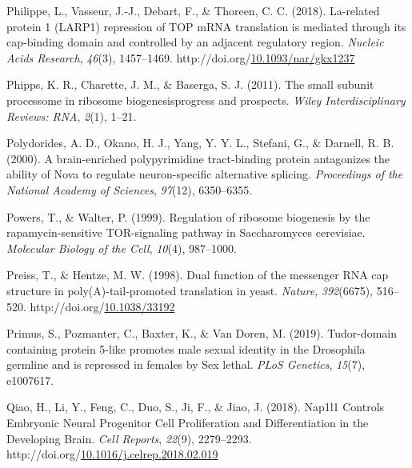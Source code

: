 \documentclass[12pt,oneside]{reedthesis}
\newlength{\cslhangindent}
\newenvironment{CSLReferences}[2] %
 {%
  \setlength{\parindent}{0pt}
  \ifodd #1 \everypar{\setlength{\hangindent}{\cslhangindent}}\ignorespaces\fi
  \ifnum #2 > 0
  \setlength{\parskip}{#2\baselineskip}
  \fi
 }%
 {}
\begin{document}
\begin{CSLReferences}{1}{0}
\leavevmode{}%
Philippe, L., Vasseur, J.-J., Debart, F., \& Thoreen, C. C. (2018). La-related protein 1 ({LARP1}) repression of {TOP mRNA} translation is mediated through its cap-binding domain and controlled by an adjacent regulatory region. \emph{Nucleic Acids Research}, \emph{46}(3), 1457--1469. http://doi.org/\href{https://doi.org/10.1093/nar/gkx1237}{10.1093/nar/gkx1237}

\leavevmode{}%
Phipps, K. R., Charette, J. M., \& Baserga, S. J. (2011). The small subunit processome in ribosome biogenesis\textemdash progress and prospects. \emph{Wiley Interdisciplinary Reviews: RNA}, \emph{2}(1), 1--21.

\leavevmode{}%
Polydorides, A. D., Okano, H. J., Yang, Y. Y. L., Stefani, G., \& Darnell, R. B. (2000). A brain-enriched polypyrimidine tract-binding protein antagonizes the ability of {Nova} to regulate neuron-specific alternative splicing. \emph{Proceedings of the National Academy of Sciences}, \emph{97}(12), 6350--6355.

\leavevmode{}%
Powers, T., \& Walter, P. (1999). Regulation of ribosome biogenesis by the rapamycin-sensitive {TOR-signaling} pathway in {Saccharomyces} cerevisiae. \emph{Molecular Biology of the Cell}, \emph{10}(4), 987--1000.

\leavevmode{}%
Preiss, T., \& Hentze, M. W. (1998). Dual function of the messenger {RNA} cap structure in poly({A})-tail-promoted translation in yeast. \emph{Nature}, \emph{392}(6675), 516--520. http://doi.org/\href{https://doi.org/10.1038/33192}{10.1038/33192}

\leavevmode{}%
Primus, S., Pozmanter, C., Baxter, K., \& Van Doren, M. (2019). Tudor-domain containing protein 5-like promotes male sexual identity in the {Drosophila} germline and is repressed in females by {Sex} lethal. \emph{PLoS Genetics}, \emph{15}(7), e1007617.

\leavevmode{}%
Qiao, H., Li, Y., Feng, C., Duo, S., Ji, F., \& Jiao, J. (2018). Nap1l1 {Controls Embryonic Neural Progenitor Cell Proliferation} and {Differentiation} in the {Developing Brain}. \emph{Cell Reports}, \emph{22}(9), 2279--2293. http://doi.org/\href{https://doi.org/10.1016/j.celrep.2018.02.019}{10.1016/j.celrep.2018.02.019}


\end{CSLReferences}
\end{document}
